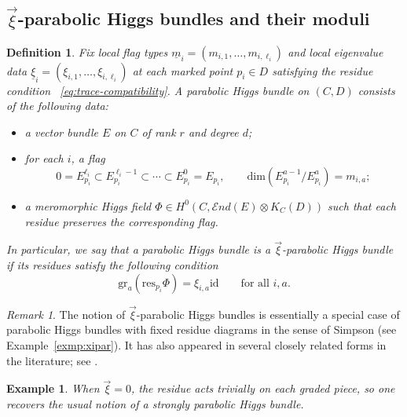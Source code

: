 \documentclass[11pt]{amsart}
\theoremstyle{plain}
\newtheorem{definition}[theorem]{Definition}
\newtheorem{example}[theorem]{Example}
\theoremstyle{definition}
\theoremstyle{remark}
\newtheorem{rem}[theorem]{Remark}
\newcommand{\End}{\mathcal E nd}
\newcommand{\id}{\mathrm{id}}
\newcommand{\gr}{\operatorname{gr}}
\def\dim{\mathrm{dim}}
\def\gr{\textrm{gr}}
\def\res{\mathrm{res}}
\def\uxi{{\underline{\xi}}}
\def\vxi{\vec{\xi}}
\def\um{{\underline{m}}}
\begin{document}
\subsection{$\vec\xi$-parabolic Higgs bundles and their moduli}\label{sec:xi-par moduli}

\begin{definition}\label{def:xi-par}
Fix local flag types $\um_i=(m_{i,1},\dots,m_{i,\ell_i})$ and local eigenvalue data $\uxi_i=(\xi_{i,1},\dots,\xi_{i,\ell_i})$ at each marked point $p_i\in D$ satisfying the residue condition ~\eqref{eq:trace-compatibility}. A parabolic Higgs bundle on $(C,D)$ consists of the following data:
\begin{itemize}
	\item a vector bundle $E$ on $C$ of rank $r$ and degree $d$;
	\item for each $i$, a flag
	\[
	0=E_{p_i}^{\ell_i}\subset E_{p_i}^{\ell_i-1}\subset \cdots \subset E_{p_i}^{0}=E_{p_i},
	\qquad \dim(E_{p_i}^{a-1}/E_{p_i}^{a})=m_{i,a};
	\]
	\item a meromorphic Higgs field $\Phi\in H^0(C,\End(E)\otimes K_C(D))$ such that each residue preserves the corresponding flag.
\end{itemize}
In particular, we say that a parabolic Higgs bundle is a $\vxi$-parabolic Higgs
bundle if its residues satisfy the following condition
	\begin{equation*}\label{eq:xipar}
	\gr_a(\res_{p_i}\Phi)=\xi_{i,a}\id
	\qquad \text{for all }i,a.
	\end{equation*}
\end{definition}
\begin{rem}
The notion of $\vxi$-parabolic Higgs bundles is essentially a special case of parabolic Higgs bundles with fixed residue diagrams in the sense of Simpson \cite{simpson-noncompact} (see Example~\ref{exmp:xipar}). It has also appeared in several closely related forms in the literature; see \cite{BGPM2020,Shu2025DSP,Yae2026StarShaped}.

\end{rem}
\begin{example}
	When $\vec\xi=0$, the residue acts trivially on each graded piece, so one recovers the usual notion of a strongly parabolic Higgs bundle. 
\end{example}
\end{document}
